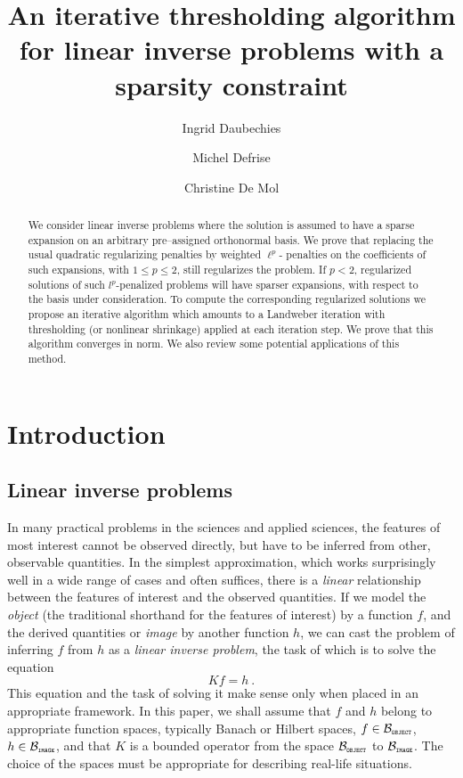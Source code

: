 \documentclass[10pt]{article}
\title{An iterative thresholding algorithm for linear inverse problems
with a sparsity constraint}
\author{Ingrid Daubechies \and Michel Defrise \and
Christine De Mol}
\def\cB{\mathcal{B}}
\def\OBJ{\mbox{\tiny\texttt{OBJECT}}}
\def\IM{\mbox{\tiny\texttt{IMAGE}}}
\begin{document}
\maketitle

\begin{abstract}


We consider linear inverse problems where the solution is assumed to have
a sparse expansion on an arbitrary pre--assigned orthonormal basis.
We prove that replacing the usual
quadratic regularizing penalties by weighted $\ell^p$-
penalties on the coefficients of such expansions, with $1 \leq p \leq 2$,
still regularizes the problem. If $p < 2$, regularized solutions of such
$l^p$-penalized problems will have sparser expansions, with respect to the
basis under consideration. To compute the corresponding regularized solutions
we propose an iterative algorithm which amounts to a Landweber iteration
with thresholding (or nonlinear shrinkage) applied at each iteration step.
We prove that this algorithm converges in norm.  We
also review some potential applications of this method.

\end{abstract}

\section{Introduction}
\subsection{Linear inverse problems}
In many practical problems in the sciences and applied sciences, the features
of most interest cannot be observed directly, but have to be inferred
from other, observable quantities. In the simplest
approximation, which works surprisingly well in a wide range of cases
and often suffices,
there is a {\em linear} relationship between the features of interest
and the observed quantities. If we model the {\em object} (the traditional
shorthand
for the features of interest) by a function $f$, and the derived quantities or
{\em image} by another function $h$, we can cast the problem of inferring
$f$ from $h$
as a {\em linear inverse problem}, the task of which is to
solve the equation
\begin{equation*}
Kf=h~.
\end{equation*}
This equation and the task of solving it make sense only when placed in an
appropriate
framework.
In this paper, we shall assume that $f$ and $h$ belong to appropriate function
spaces, typically Banach or Hilbert spaces,
$f \in \cB_{\OBJ}$,
$h \in \cB_{\IM}$, and that $K$ is a bounded  operator from
the space  $\cB_{\OBJ}$ to
$ \cB_{\IM}$. The choice of the spaces must be
appropriate for describing real-life situations.
\end{document}
